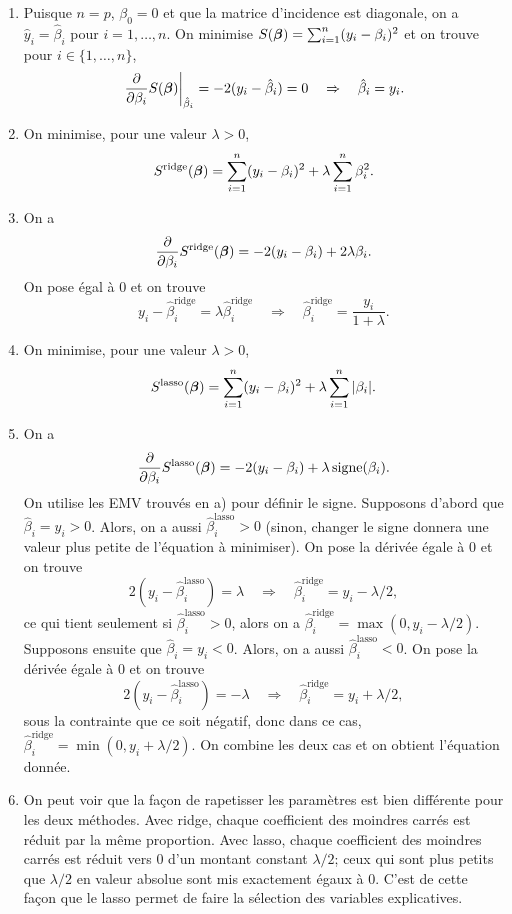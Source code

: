 \begin{solution}{2.2}
\begin{enumerate}
\item Puisque $n=p$, $\beta_0=0$ et que la matrice d'incidence est diagonale, on a $\hat{y}_i = \hat\beta_i$ pour $i=1,\ldots,n$. On minimise $S(\mbox{\boldmath$\beta$})=\sum_{i=1}^n (y_i-\beta_i)^2$ et on trouve pour $i\in \{1,\ldots,n\}$,
$$
\left.\frac{\partial}{\partial\beta_i}S(\mbox{\boldmath$\beta$})\right|_{\hat\beta_i}= -2 (y_i-\hat\beta_i) =0 \quad \Rightarrow \quad \hat\beta_i =  y_i.
$$

\item On minimise, pour une valeur $\lambda>0$,
$$
S^{\mathrm{ridge}}(\mbox{\boldmath$\beta$})=\sum_{i=1}^n (y_i-\beta_i)^2 +\lambda \sum_{i=1}^n \beta_i^2.
$$

\item On a
$$
\frac{\partial}{\partial\beta_i}S^{\mathrm{ridge}}(\mbox{\boldmath$\beta$})=-2(y_i-\beta_i) +2 \lambda  \beta_i.
$$
On pose égal à 0 et on trouve
$$
y_i-\hat \beta_i^{\mathrm{ridge}} = \lambda  \hat\beta_i^{\mathrm{ridge}} \quad \Rightarrow \quad \hat\beta_i^{\mathrm{ridge}} =  \frac{y_i}{1+\lambda}.
$$

\item On minimise, pour une valeur $\lambda>0$,
$$
S^{\mathrm{lasso}}(\mbox{\boldmath$\beta$})=\sum_{i=1}^n (y_i-\beta_i)^2 +\lambda \sum_{i=1}^n |\beta_i|.
$$

\item On a
$$
\frac{\partial}{\partial\beta_i}S^{\mathrm{lasso}}(\mbox{\boldmath$\beta$})=-2(y_i-\beta_i) + \lambda\, \mathrm{signe}(\beta_i) .
$$
On utilise les EMV trouvés en a) pour définir le signe. Supposons d'abord que $\hat\beta_i = y_i>0$. Alors, on a aussi $\hat\beta_i^{\mathrm{lasso}}>0$ (sinon, changer le signe donnera une valeur plus petite de l'équation à minimiser). On pose la dérivée égale à 0 et on trouve
$$
2(y_i-\hat \beta_i^{\mathrm{lasso}}) = \lambda  \quad \Rightarrow \quad \hat\beta_i^{\mathrm{ridge}} =  y_i- \lambda/2,
$$
ce qui tient seulement si $\hat\beta_i^{\mathrm{lasso}}>0$, alors on a $\hat\beta_i^{\mathrm{ridge}} =  \max(0,y_i- \lambda/2)$.
Supposons ensuite que $\hat \beta_i = y_i <0$. Alors, on a aussi $\hat\beta_i^{\mathrm{lasso}}<0$. On pose la dérivée égale à 0 et on trouve
$$
2(y_i-\hat \beta_i^{\mathrm{lasso}}) = -\lambda  \quad \Rightarrow \quad \hat\beta_i^{\mathrm{ridge}} =  y_i+ \lambda/2,
$$
sous la contrainte que ce soit négatif, donc dans ce cas, $\hat\beta_i^{\mathrm{ridge}} =  \min(0,y_i+\lambda/2)$. On combine les deux cas et on obtient l'équation donnée.

\item On peut voir que la façon de rapetisser les paramètres est bien différente pour les deux méthodes. Avec ridge, chaque coefficient des moindres carrés est réduit par la même proportion. Avec lasso, chaque coefficient des moindres carrés est réduit vers 0 d'un montant constant $\lambda/2$; ceux qui sont plus petits que $\lambda/2$ en valeur absolue sont mis exactement égaux à 0. C'est de cette façon que le lasso permet de faire la sélection des variables explicatives.

\end{enumerate}
\end{solution}
